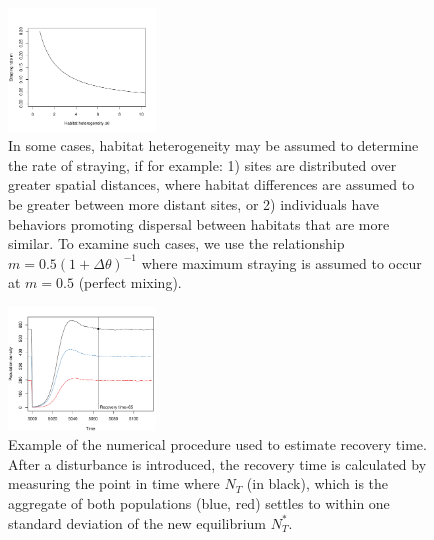 \documentclass{revtex4}
\begin{document}
% 




\begin{figure}[h]
  \captionsetup{justification=raggedright,
singlelinecheck=false
}
\centering
\includegraphics[width=0.35\textwidth]{fig_mthetarelation.pdf}
\caption{
In some cases, habitat heterogeneity may be assumed to determine the rate of straying, if for example:
1) sites are distributed over greater spatial distances, where habitat differences are assumed to be greater between more distant sites, or 2) individuals have behaviors promoting dispersal between habitats that are more similar. To examine such cases, we use the relationship $m= 0.5(1 + \Delta\theta)^{-1}$ where maximum straying is assumed to occur at $m=0.5$ (perfect mixing).
} \label{fig:mthetarelation}
\end{figure}


\begin{figure}
  \captionsetup{justification=raggedright,
singlelinecheck=false
}
\centering
\includegraphics[width=0.35\textwidth]{fig_recovery.pdf}
\caption{
Example of the numerical procedure used to estimate recovery time. After a disturbance is introduced, the recovery time is calculated by measuring the point in time where $N_T$ (in black), which is the aggregate of both populations (blue, red) settles to within one standard deviation of the new equilibrium $N_T^*$. 
} \label{fig:recovery}
\end{figure}
\end{document}
